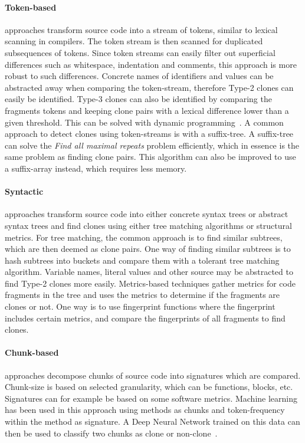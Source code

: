 \paragraph{Token-based} approaches transform source code into a stream of tokens, similar to
lexical scanning in compilers. The token stream is then scanned for duplicated
subsequences of tokens. Since token streams can easily filter out superficial differences
such as whitespace, indentation and comments, this approach is more robust to such
differences. Concrete names of identifiers and values can be abstracted away when comparing
the token-stream, therefore Type-2 clones can easily be identified. Type-3 clones can also
be identified by comparing the fragments tokens and keeping clone pairs with a lexical
difference lower than a given threshold. This can be solved with dynamic
programming~\cite{BakerSparseDynamicProgramming}. A common approach to detect clones using
token-streams is with a suffix-tree. A suffix-tree can solve the \textit{Find all maximal
	repeats} problem efficiently, which in essence is the same problem as finding clone pairs.
This algorithm can also be improved to use a suffix-array instead, which requires less
memory.

\paragraph{Syntactic} approaches transform source code into either concrete syntax trees
or abstract syntax trees and find clones using either tree matching algorithms or
structural metrics. For tree matching, the common approach is to find similar subtrees,
which are then deemed as clone pairs. One way of finding similar subtrees is to hash
subtrees into buckets and compare them with a tolerant tree matching algorithm. Variable
names, literal values and other source may be abstracted to find Type-2 clones more
easily. Metrics-based techniques gather metrics for code fragments in the tree and uses
the metrics to determine if the fragments are clones or not. One way is to use
fingerprint functions where the fingerprint includes certain metrics, and compare the
fingerprints of all fragments to find clones.

\paragraph{Chunk-based} approaches decompose chunks of source code into signatures which are
compared. Chunk-size is based on selected granularity, which can be functions, blocks,
etc. Signatures can for example be based on some software metrics. Machine learning has
been used in this approach using methods as chunks and token-frequency within the method
as signature. A Deep Neural Network trained on this data can then be used to classify two
chunks as clone or non-clone~\cite{CCLearner}.

